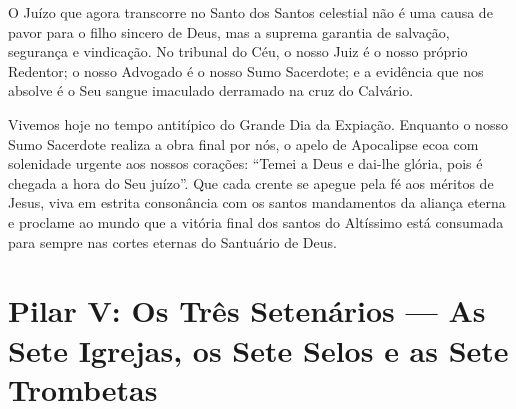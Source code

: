 \documentclass[11pt,a4paper,openany]{book}
\begin{document}
O Juízo que agora transcorre no Santo dos Santos celestial não é uma causa de pavor para o filho sincero de Deus, mas a suprema garantia de salvação, segurança e vindicação. No tribunal do Céu, o nosso Juiz é o nosso próprio Redentor; o nosso Advogado é o nosso Sumo Sacerdote; e a evidência que nos absolve é o Seu sangue imaculado derramado na cruz do Calvário.

Vivemos hoje no tempo antitípico do Grande Dia da Expiação. Enquanto o nosso Sumo Sacerdote realiza a obra final por nós, o apelo de Apocalipse ecoa com solenidade urgente aos nossos corações: ``Temei a Deus e dai-lhe glória, pois é chegada a hora do Seu juízo''. Que cada crente se apegue pela fé aos méritos de Jesus, viva em estrita consonância com os santos mandamentos da aliança eterna e proclame ao mundo que a vitória final dos santos do Altíssimo está consumada para sempre nas cortes eternas do Santuário de Deus.
\chapter{Pilar V: Os Três Setenários — As Sete Igrejas, os Sete Selos e as Sete Trombetas}
\end{document}
